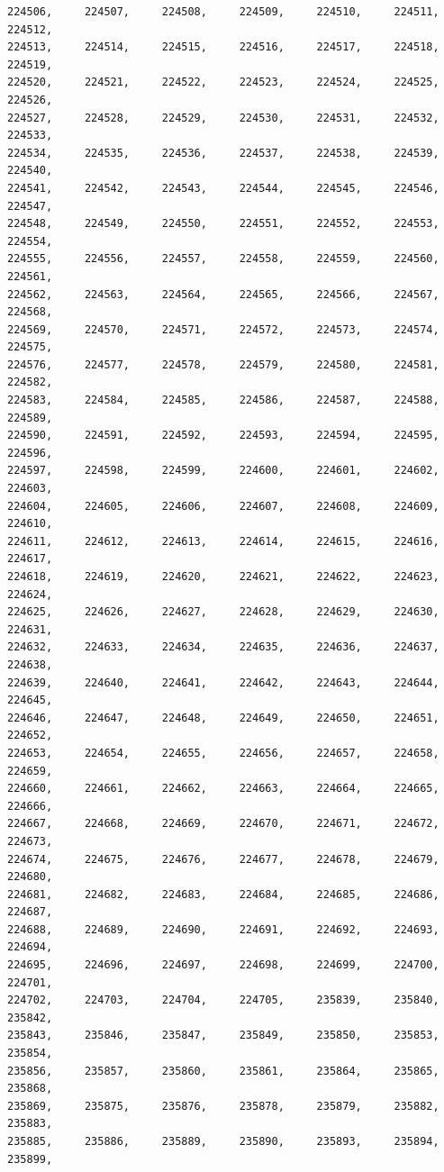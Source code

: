\documentclass[a4paper,11pt]{report}
\begin{document}
\begin{verbatim}
224506,     224507,     224508,     224509,     224510,     224511,     224512,
224513,     224514,     224515,     224516,     224517,     224518,     224519,
224520,     224521,     224522,     224523,     224524,     224525,     224526,
224527,     224528,     224529,     224530,     224531,     224532,     224533,
224534,     224535,     224536,     224537,     224538,     224539,     224540,
224541,     224542,     224543,     224544,     224545,     224546,     224547,
224548,     224549,     224550,     224551,     224552,     224553,     224554,
224555,     224556,     224557,     224558,     224559,     224560,     224561,
224562,     224563,     224564,     224565,     224566,     224567,     224568,
224569,     224570,     224571,     224572,     224573,     224574,     224575,
224576,     224577,     224578,     224579,     224580,     224581,     224582,
224583,     224584,     224585,     224586,     224587,     224588,     224589,
224590,     224591,     224592,     224593,     224594,     224595,     224596,
224597,     224598,     224599,     224600,     224601,     224602,     224603,
224604,     224605,     224606,     224607,     224608,     224609,     224610,
224611,     224612,     224613,     224614,     224615,     224616,     224617,
224618,     224619,     224620,     224621,     224622,     224623,     224624,
224625,     224626,     224627,     224628,     224629,     224630,     224631,
224632,     224633,     224634,     224635,     224636,     224637,     224638,
224639,     224640,     224641,     224642,     224643,     224644,     224645,
224646,     224647,     224648,     224649,     224650,     224651,     224652,
224653,     224654,     224655,     224656,     224657,     224658,     224659,
224660,     224661,     224662,     224663,     224664,     224665,     224666,
224667,     224668,     224669,     224670,     224671,     224672,     224673,
224674,     224675,     224676,     224677,     224678,     224679,     224680,
224681,     224682,     224683,     224684,     224685,     224686,     224687,
224688,     224689,     224690,     224691,     224692,     224693,     224694,
224695,     224696,     224697,     224698,     224699,     224700,     224701,
224702,     224703,     224704,     224705,     235839,     235840,     235842,
235843,     235846,     235847,     235849,     235850,     235853,     235854,
235856,     235857,     235860,     235861,     235864,     235865,     235868,
235869,     235875,     235876,     235878,     235879,     235882,     235883,
235885,     235886,     235889,     235890,     235893,     235894,     235899,

\end{verbatim}
\end{document}

